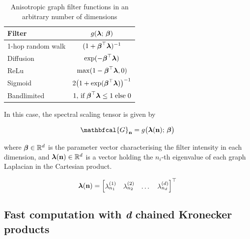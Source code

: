 \begin{table}[t]
    \def\arraystretch{1.7}
    \small
    \begin{center}
        \begin{tabular}{|l|c|}
            \hline
            \textbf{Filter}   & $g(\boldsymbol{\lambda}; \,\boldsymbol{\beta})$                                            \\
            \hline
            1-hop random walk & $(1 + \boldsymbol{\beta}^\top\boldsymbol{\lambda})^{-1}$                                   \\
            \hline
            Diffusion         & $\exp(-\boldsymbol{\beta}^\top\boldsymbol{\lambda})$                                       \\
            \hline
            ReLu              & $\max (1 - \boldsymbol{\beta}^\top\boldsymbol{\lambda}, 0)$                                \\
            \hline
            Sigmoid           & $2 \big( 1 + \exp(\boldsymbol{\beta}^\top\boldsymbol{\lambda})\big)^{-1}$                  \\
            \hline
            Bandlimited       & $1, \,\text{if} \; \boldsymbol{\beta}^\top\boldsymbol{\lambda} \leq 1 \; \text{else} \; 0$ \\
            \hline
        \end{tabular}
    \end{center}
    \caption{Anisotropic graph filter functions in an arbitrary number of dimensions}
    \label{tab:anis_filters}
\end{table}


In this case, the spectral scaling tensor is given by 

\begin{equation}
    \label{eq:Gn_dd2}
    \mathbfcal{G}_{\mathbf{n}} = g\big(\lambdaa(\mathbf{n}); \, \betaa\big)
\end{equation}

where $\boldsymbol{\beta} \in \mathbb{R}^{d}$ is the parameter vector characterising the filter intensity in each dimension, and $\boldsymbol{\lambda}(\mathbf{n}) \in \mathbb{R}^d$ is a vector holding the $n_i$-th eigenvalue of each graph Laplacian in the Cartesian product. 

$$
\boldsymbol{\lambda}(\mathbf{n}) = 
\begin{bmatrix}
    \lambda^{(1)}_{n_1} & \lambda^{(2)}_{n_2} & \dots & \lambda^{(d)}_{n_d}    
\end{bmatrix}^\top
$$

\subsection{Fast computation with \textit{d} chained Kronecker products}


